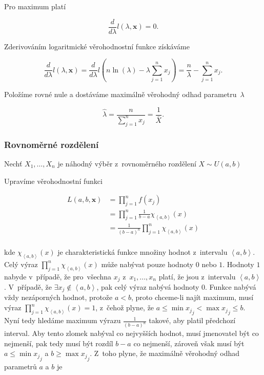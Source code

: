 \documentclass[thesis=B,czech]{FITthesis}[2012/06/26]
\begin{document}
\noindent Pro maximum platí

$$\frac{d}{d\lambda}l(\lambda,\boldsymbol{x})=0.$$

\noindent Zderivováním logaritmické věrohodnostní funkce získáváme

$$\frac{d}{d\lambda}l(\lambda,\boldsymbol{x})=\frac{d}{d\lambda}l(n\ln(\lambda)-\lambda\sum^{n}_{j=1}x_{j})=\frac{n}{\lambda}-\sum^{n}_{j=1}x_{j}.$$

\noindent Položíme rovné nule a dostáváme maximálně věrohodný odhad parametru~$\lambda$

$$\hat{\lambda}=\frac{n}{\sum^{n}_{j=1}x_{j}}=\frac{1}{\bar{X}}.$$

\subsubsection{Rovnoměrné rozdělení}
Nechť $X_1,\dotsc,X_n$ je náhodný výběr z~rovnoměrného rozdělení $X \sim U(a, b)$

Upravíme věrohodnostní funkci 

\begin{align*}
L(a,b,\boldsymbol{x}) 
&= \prod_{j=1}^{n}f(x_{j}) \\
&= \prod_{j=1}^{n}\frac{1}{b-a} \chi_{\left \langle a,b \right \rangle}(x) \\
&= \frac{1}{(b-a)^{n}}\prod_{j=1}^{n}\chi_{\left \langle a,b \right \rangle}(x) \\
\end{align*}

\noindent kde $\chi_{\left \langle a,b \right \rangle}(x)$ je charakteristická funkce množiny hodnot z~intervalu $\left \langle a,b \right \rangle$. Celý výraz $\prod_{j=1}^{n}\chi_{\left \langle a,b \right \rangle}(x)$ může nabývat pouze hodnoty $0$ nebo $1$. Hodnoty $1$ nabyde v~případě, že pro~všechna $x_{j}$ z~$x_{1},...,x_{n}$ platí, že jsou z~intervalu $\left \langle a,b \right \rangle$. V~případě, že $\exists x_{j} \notin \left \langle a,b \right \rangle$, pak celý výraz nabývá hodnoty $0$. Funkce nabývá vždy nezáporných hodnot, protože $a<b$, proto chceme-li najít maximum, musí výraz $\prod_{j=1}^{n}\chi_{\left \langle a,b \right \rangle}(x)=1$, z~čehož plyne, že $a\leq \min{x_{j}}_{j} < \max{x_{j}}_{j} \leq b$. Nyní tedy hledáme maximum výrazu $\frac{1}{(b-a)^n}$ takové, aby platil předchozí interval. Aby tento zlomek nabýval co nejvyšších hodnot, musí jmenovatel být co nejmenší, pak tedy musí být rozdíl $b-a$ co nejmenší, zároveň však musí být $a\leq\min{x_{j}}_{j}$ a $b\geq\max{x_{j}}_{j}$. Z~toho plyne, že maximálně věrohodný odhad parametrů $a$ a $b$ je 
\end{document}
